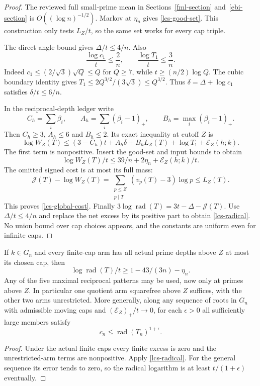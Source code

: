 \begin{proof}
The reviewed full small-prime mean in Sections~\ref{fml-section}
and~\ref{ebi-section} is $O((\log n)^{-1/2})$.
Markov at $\eta_n$ gives \eqref{lcs-good-set}. This construction
only tests $L_Z/t$, so the same set works for every cap triple.

The direct angle bound gives $\Delta/t\le4/n$. Also
\begin{equation}\label{lcs-input-bounds}
 \frac{\log c_1}t\le\frac2n,\qquad
 \frac{\log T_1}t\le\frac3n.
\end{equation}
Indeed $c_1\le(2/\sqrt3)\sqrt Q\le Q$ for $Q\ge7$,
while $t\ge(n/2)\log Q$. The cubic boundary identity gives
$T_1\le2Q^{3/2}/(3\sqrt3)\le Q^{3/2}$.
Thus $\delta=\Delta+\log c_1$ satisfies $\delta/t\le6/n$.

In the reciprocal-depth ledger write
\[
 C_h=\sum_i\beta_i,\qquad
 A_h=\sum_i(\beta_i-1)_+,\qquad
 B_h=\max_i(\beta_i-1)_+.
\]
Then $C_h\ge3$, $A_h\le6$ and $B_h\le2$. Its exact inequality
at cutoff $Z$ is
\[
 \log W_Z(T)\le(3-C_h)t+A_h\delta+B_hL_Z(T)
                         +\log T_1+\mathcal E_Z(h;k).
\]
The first term is nonpositive. Insert the good-set and input bounds
to obtain
\[
 \log W_Z(T)/t\le39/n+2\eta_n+\mathcal E_Z(h;k)/t.
\]
The omitted signed cost is at most its full mass:
\[
 \mathcal J(T)-\log W_Z(T)
 =\sum_{\substack{p\le Z\\p\mid T}}(v_p(T)-3)\log p\le L_Z(T).
\]
This proves \eqref{lcs-global-cost}. Finally
$3\log\operatorname{rad}(T)=3t-\Delta-\mathcal J(T)$.
Use $\Delta/t\le4/n$ and replace the net excess by its positive
part to obtain \eqref{lcs-radical}. No union bound over cap choices
appears, and the constants are uniform even for infinite caps.
\end{proof}

\begin{corollary}\label{lcs-subclass}
If $k\in G_n$ and every finite-cap arm has all actual prime depths
above $Z$ at most its chosen cap, then
\begin{equation}\label{lcs-cap-radical}
 \log\operatorname{rad}(T)/t\ge1-43/(3n)-\eta_n.
\end{equation}
Any of the five maximal reciprocal patterns may be used, now only
at primes above $Z$. In particular one quotient arm squarefree
above $Z$ suffices, with the other two arms unrestricted.
More generally, along any sequence of roots in $G_n$ with admissible
moving caps and $(\mathcal E_Z)_+/t\to0$, for each $\epsilon>0$
all sufficiently large members satisfy
\[
 c_n\le\operatorname{rad}(T_n)^{1+\epsilon}.
\]
\end{corollary}
\begin{proof}
Under the actual finite caps every finite excess is zero and the
unrestricted-arm terms are nonpositive. Apply
\eqref{lcs-radical}. For the general sequence its error tends to zero,
so the radical logarithm is at least $t/(1+\epsilon)$ eventually.
\end{proof}


